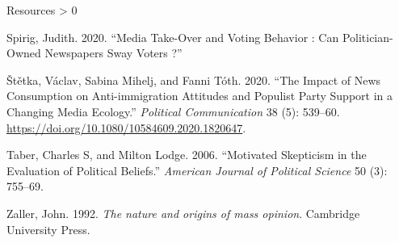 \documentclass[
  ignorenonframetext,
]{beamer}
\newlength{\cslhangindent}
\newenvironment{CSLReferences}[2] %
 {%
  \setlength{\parindent}{0pt}
  \ifodd #1 \everypar{\setlength{\hangindent}{\cslhangindent}}\ignorespaces\fi
  \ifnum #2 > 0
  \setlength{\parskip}{#2\baselineskip}
  \fi
 }%
 {}
\begin{document}
\begin{frame}[allowframebreaks]{Resources}
\begin{CSLReferences}{1}{0}
\leavevmode\hypertarget{ref-Spirig2020}{}%
Spirig, Judith. 2020. {``{Media Take-Over and Voting Behavior : Can
Politician-Owned Newspapers Sway Voters ?}''}

\leavevmode\hypertarget{ref-Stetka2020}{}%
Štětka, Václav, Sabina Mihelj, and Fanni Tóth. 2020. {``{The Impact of
News Consumption on Anti-immigration Attitudes and Populist Party
Support in a Changing Media Ecology}.''} \emph{Political Communication}
38 (5): 539--60. \url{https://doi.org/10.1080/10584609.2020.1820647}.

\leavevmode\hypertarget{ref-Taber2006}{}%
Taber, Charles S, and Milton Lodge. 2006. {``{Motivated Skepticism in
the Evaluation of Political Beliefs}.''} \emph{American Journal of
Political Science} 50 (3): 755--69.

\leavevmode\hypertarget{ref-Zaller1992}{}%
Zaller, John. 1992. \emph{{The nature and origins of mass opinion}}.
Cambridge University Press.

\end{CSLReferences}
\end{frame}
\end{document}
